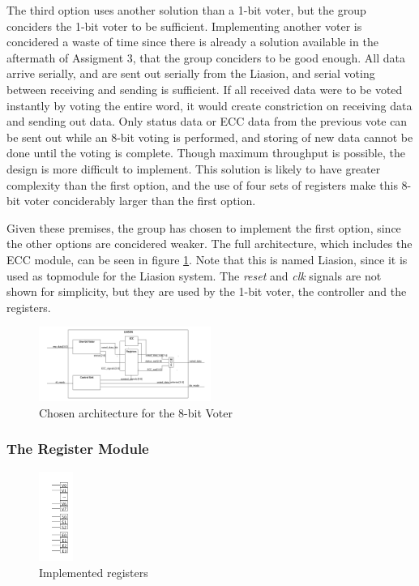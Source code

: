\documentclass[a4paper]{IEEEtran}
\begin{document}
The third option uses another solution than a 1-bit voter, but the group conciders the 1-bit voter to be sufficient.
Implementing another voter is concidered a waste of time since there is already a solution available in the aftermath of Assigment 3\protect\cite{assignment-3}, that the group conciders to be good enough.
All data arrive serially, and are sent out serially from the Liasion, and serial voting between receiving and sending is sufficient.
If all received data were to be voted instantly by voting the entire word, it would create constriction on receiving data and sending out data.
Only status data or ECC data from the previous vote can be sent out while an 8-bit voting is performed, and storing of new data cannot be done until the voting is complete.
Though maximum throughput is possible, the design is more difficult to implement.
This solution is likely to have greater complexity than the first option, and the use of four sets of registers make this 8-bit voter conciderably larger than the first option.

Given these premises, the group has chosen to implement the first option, since the other options are concidered weaker.
The full architecture, which includes the ECC module, can be seen in figure \ref{fig:ArchitectureFinal}.
Note that this is named Liasion, since it is used as topmodule for the Liasion system.
The \textit{reset} and \textit{clk} signals are not shown for simplicity, but they are used by the 1-bit voter, the controller and the registers.

\begin{figure}[h!]
    \centering
    \includegraphics[width=0.5\textwidth]{Figures/Solution/ArchitectureFinal}
    \caption{Chosen architecture for the 8-bit Voter}
    \label{fig:ArchitectureFinal}
\end{figure}

\subsubsection{The Register Module}
\begin{figure}[h!]
    \centering
    \includegraphics[width=0.10\textwidth]{Figures/Solution/Registers}
    \caption{Implemented registers}
    \label{fig:Registers}
\end{figure}
\end{document}
